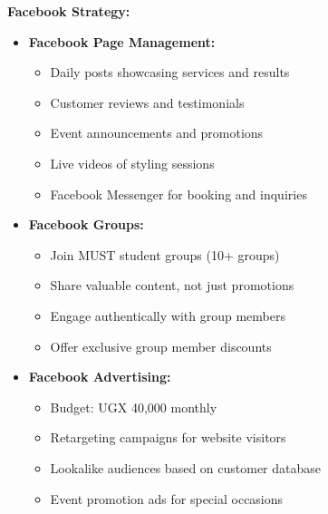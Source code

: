 \documentclass[a4paper,12pt]{article}
\begin{document}
\textbf{Facebook Strategy:}
\begin{itemize}[leftmargin=2em]
    \item \textbf{Facebook Page Management:}
    \begin{itemize}
        \item Daily posts showcasing services and results
        \item Customer reviews and testimonials
        \item Event announcements and promotions
        \item Live videos of styling sessions
        \item Facebook Messenger for booking and inquiries
    \end{itemize}
    
    \item \textbf{Facebook Groups:}
    \begin{itemize}
        \item Join MUST student groups (10+ groups)
        \item Share valuable content, not just promotions
        \item Engage authentically with group members
        \item Offer exclusive group member discounts
    \end{itemize}
    
    \item \textbf{Facebook Advertising:}
    \begin{itemize}
        \item Budget: UGX 40,000 monthly
        \item Retargeting campaigns for website visitors
        \item Lookalike audiences based on customer database
        \item Event promotion ads for special occasions
    \end{itemize}
\end{itemize}
\end{document}
